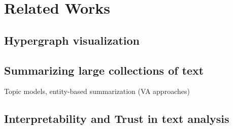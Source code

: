 \section{Related Works}
\subsection{Hypergraph visualization}
\cite{fischer2021hypergraphsurvey}
\subsection{Summarizing large collections of text}
Topic models, entity-based summarization (VA approaches)
\subsection{Interpretability and Trust in text analysis}